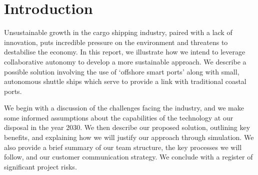     \section{Introduction}
    Unsustainable growth in the cargo shipping industry, paired with a lack of innovation, puts incredible pressure on the environment and threatens to destabilise the economy. In this report, we illustrate how we intend to leverage collaborative autonomy to develop a more sustainable approach. We describe a possible solution involving the use of `offshore smart ports' along with small, autonomous shuttle ships which serve to provide a link with traditional coastal ports. 
    
    We begin with a discussion of the challenges facing the industry, and we make some informed assumptions about the capabilities of the technology at our disposal in the year 2030. We then describe our proposed solution, outlining key benefits, and explaining how we will justify our approach through simulation. We also provide a brief summary of our team structure, the key processes we will follow, and our customer communication strategy. We conclude with a register of significant project risks.